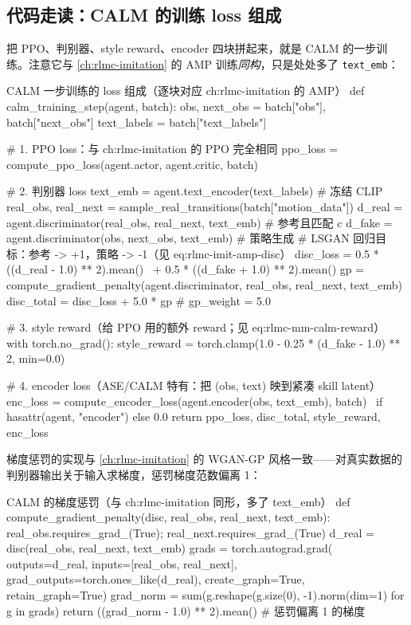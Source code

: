 \subsection{代码走读：CALM 的训练 loss 组成}
\label{sec:rlmc-mm-calm-loss}

把 PPO、判别器、style reward、encoder 四块拼起来，就是 CALM 的一步训练。注意它与 \cref{ch:rlmc-imitation} 的 AMP 训练\emph{同构}，只是处处多了 \verb|text_emb|：

\begin{codebox}[Python]{CALM 一步训练的 loss 组成（逐块对应 ch:rlmc-imitation 的 AMP）}
def calm_training_step(agent, batch):
    obs, next_obs = batch["obs"], batch["next_obs"]
    text_labels = batch["text_labels"]

    # 1. PPO loss：与 ch:rlmc-imitation 的 PPO 完全相同
    ppo_loss = compute_ppo_loss(agent.actor, agent.critic, batch)

    # 2. 判别器 loss
    text_emb = agent.text_encoder(text_labels)                       # 冻结 CLIP
    real_obs, real_next = sample_real_transitions(batch["motion_data"])
    d_real = agent.discriminator(real_obs, real_next, text_emb)      # 参考且匹配 c
    d_fake = agent.discriminator(obs, next_obs, text_emb)            # 策略生成
    # LSGAN 回归目标：参考 -> +1，策略 -> -1（见 eq:rlmc-imit-amp-disc）
    disc_loss = 0.5 * ((d_real - 1.0) ** 2).mean() \
              + 0.5 * ((d_fake + 1.0) ** 2).mean()
    gp = compute_gradient_penalty(agent.discriminator, real_obs, real_next, text_emb)
    disc_total = disc_loss + 5.0 * gp                                # gp_weight = 5.0

    # 3. style reward（给 PPO 用的额外 reward；见 eq:rlmc-mm-calm-reward）
    with torch.no_grad():
        style_reward = torch.clamp(1.0 - 0.25 * (d_fake - 1.0) ** 2, min=0.0)

    # 4. encoder loss（ASE/CALM 特有：把 (obs, text) 映到紧凑 skill latent）
    enc_loss = compute_encoder_loss(agent.encoder(obs, text_emb), batch) \
               if hasattr(agent, "encoder") else 0.0
    return ppo_loss, disc_total, style_reward, enc_loss
\end{codebox}

梯度惩罚的实现与 \cref{ch:rlmc-imitation} 的 WGAN-GP 风格一致——对真实数据的判别器输出关于输入求梯度，惩罚梯度范数偏离 1：

\begin{codebox}[Python]{CALM 的梯度惩罚（与 ch:rlmc-imitation 同形，多了 text\_emb）}
def compute_gradient_penalty(disc, real_obs, real_next, text_emb):
    real_obs.requires_grad_(True); real_next.requires_grad_(True)
    d_real = disc(real_obs, real_next, text_emb)
    grads = torch.autograd.grad(
        outputs=d_real, inputs=[real_obs, real_next],
        grad_outputs=torch.ones_like(d_real),
        create_graph=True, retain_graph=True)
    grad_norm = sum(g.reshape(g.size(0), -1).norm(dim=1) for g in grads)
    return ((grad_norm - 1.0) ** 2).mean()        # 惩罚偏离 1 的梯度
\end{codebox}

